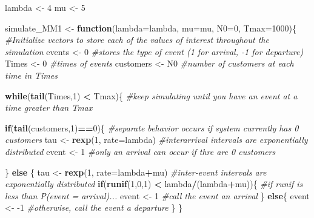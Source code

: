 \documentclass[]{article}
\newenvironment{Shaded}{\begin{snugshade}}{\end{snugshade}}
\newcommand{\CommentTok}[1]{\textcolor[rgb]{0.56,0.35,0.01}{\textit{#1}}}
\newcommand{\ControlFlowTok}[1]{\textcolor[rgb]{0.13,0.29,0.53}{\textbf{#1}}}
\newcommand{\DataTypeTok}[1]{\textcolor[rgb]{0.13,0.29,0.53}{#1}}
\newcommand{\DecValTok}[1]{\textcolor[rgb]{0.00,0.00,0.81}{#1}}
\newcommand{\KeywordTok}[1]{\textcolor[rgb]{0.13,0.29,0.53}{\textbf{#1}}}
\newcommand{\NormalTok}[1]{#1}
\newcommand{\OperatorTok}[1]{\textcolor[rgb]{0.81,0.36,0.00}{\textbf{#1}}}
\newcommand{\StringTok}[1]{\textcolor[rgb]{0.31,0.60,0.02}{#1}}
\begin{document}
\begin{Shaded}
\begin{Highlighting}[]
\NormalTok{lambda <-}\StringTok{ }\DecValTok{4}
\NormalTok{mu <-}\StringTok{ }\DecValTok{5}

\NormalTok{simulate_MM1 <-}\StringTok{ }\ControlFlowTok{function}\NormalTok{(}\DataTypeTok{lambda=}\NormalTok{lambda, }\DataTypeTok{mu=}\NormalTok{mu, }\DataTypeTok{N0=}\DecValTok{0}\NormalTok{, }\DataTypeTok{Tmax=}\DecValTok{1000}\NormalTok{)\{}
  \CommentTok{#Initialize vectors to store each of the values of interest throughout the simulation}
\NormalTok{  events <-}\StringTok{ }\DecValTok{0} \CommentTok{#stores the type of event (1 for arrival, -1 for departure)}
\NormalTok{  Times <-}\StringTok{ }\DecValTok{0} \CommentTok{#times of events}
\NormalTok{  customers <-}\StringTok{ }\NormalTok{N0 }\CommentTok{#number of customers at each time in Times}
  
  \ControlFlowTok{while}\NormalTok{(}\KeywordTok{tail}\NormalTok{(Times,}\DecValTok{1}\NormalTok{) }\OperatorTok{<}\StringTok{ }\NormalTok{Tmax)\{ }\CommentTok{#keep simulating until you have an event at a time greater than Tmax}
    
    \ControlFlowTok{if}\NormalTok{(}\KeywordTok{tail}\NormalTok{(customers,}\DecValTok{1}\NormalTok{)}\OperatorTok{==}\DecValTok{0}\NormalTok{)\{ }\CommentTok{#separate behavior occurs if system currently has 0 customers}
\NormalTok{      tau <-}\StringTok{ }\KeywordTok{rexp}\NormalTok{(}\DecValTok{1}\NormalTok{, }\DataTypeTok{rate=}\NormalTok{lambda) }\CommentTok{#interarrival intervals are exponentially distributed}
\NormalTok{      event <-}\StringTok{ }\DecValTok{1} \CommentTok{#only an arrival can occur if thre are 0 customers}
      
\NormalTok{    \} }\ControlFlowTok{else}\NormalTok{ \{}
\NormalTok{      tau <-}\StringTok{ }\KeywordTok{rexp}\NormalTok{(}\DecValTok{1}\NormalTok{, }\DataTypeTok{rate=}\NormalTok{lambda}\OperatorTok{+}\NormalTok{mu) }\CommentTok{#inter-event intervals are exponentially distributed}
      \ControlFlowTok{if}\NormalTok{(}\KeywordTok{runif}\NormalTok{(}\DecValTok{1}\NormalTok{,}\DecValTok{0}\NormalTok{,}\DecValTok{1}\NormalTok{) }\OperatorTok{<}\StringTok{ }\NormalTok{lambda}\OperatorTok{/}\NormalTok{(lambda}\OperatorTok{+}\NormalTok{mu))\{ }\CommentTok{#if runif is less than P(event = arrival)...}
\NormalTok{        event <-}\StringTok{ }\DecValTok{1} \CommentTok{#call the event an arrival}
\NormalTok{      \} }\ControlFlowTok{else}\NormalTok{\{ }
\NormalTok{        event <-}\StringTok{ }\DecValTok{-1} \CommentTok{#otherwise, call the event a departure}
\NormalTok{      \}}
\NormalTok{    \}}
    

\end{Highlighting}
\end{Shaded}
\end{document}
